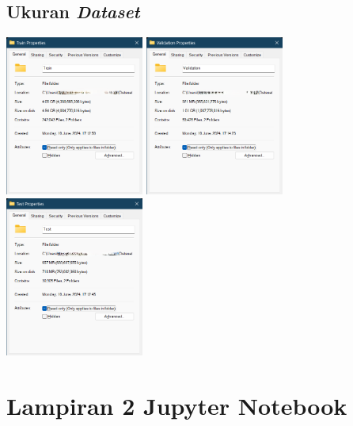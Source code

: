 \documentclass[12pt,oneside,bahasa]{book}
\begin{document}
\subsection*{Ukuran \emph{Dataset}}
\begin{center}
\includegraphics[width=4.55cm]{images/prop_train} \includegraphics[width=4.55cm]{images/prop_valid}
\includegraphics[width=4.55cm]{images/prop_test}
\par\end{center}

\clearpage
{}

\section*{Lampiran 2 Jupyter Notebook}

\end{document}
